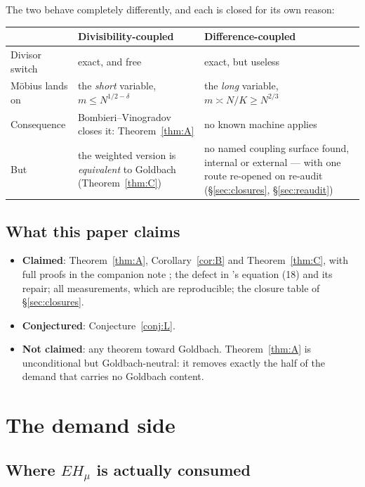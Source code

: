 \documentclass[11pt,a4paper]{article}
\theoremstyle{plain}
\theoremstyle{definition}
\begin{document}
\noindent
The two behave completely differently, and each is closed for its own
reason:

\begin{center}
\begin{tabular}{p{}p{}p{}}
\hline
 & \textbf{Divisibility-coupled} & \textbf{Difference-coupled}\\
\hline
Divisor switch & exact, and free & exact, but useless\\
M\"obius lands on & the \emph{short} variable, $m\le N^{1/2-\delta}$ &
 the \emph{long} variable, $m \asymp N/K \ge N^{2/3}$\\
Consequence & Bombieri--Vinogradov closes it: Theorem~\ref{thm:A} &
 no known machine applies\\
But & the weighted version is \emph{equivalent} to Goldbach
 (Theorem~\ref{thm:C}) & no named coupling surface found, internal or
 external --- with one route re-opened on re-audit
 (\S\ref{sec:closures}, \S\ref{sec:reaudit})\\
\hline
\end{tabular}
\end{center}

\subsection{What this paper claims}

\begin{itemize}
\item \textbf{Claimed}: Theorem~\ref{thm:A}, Corollary~\ref{cor:B} and
  Theorem~\ref{thm:C}, with full proofs in the companion note
  \cite{ThmA}; the defect in \cite{HL}'s equation (18) and its repair;
  all measurements, which are reproducible; the closure table of
  \S\ref{sec:closures}.
\item \textbf{Conjectured}: Conjecture~\ref{conj:L}.
\item \textbf{Not claimed}: any theorem toward Goldbach.
  Theorem~\ref{thm:A} is unconditional but Goldbach-neutral: it
  removes exactly the half of the demand that carries no Goldbach
  content.
\end{itemize}

\section{The demand side}\label{sec:demand}

\subsection{Where $EH_\mu$ is actually consumed}
\end{document}
